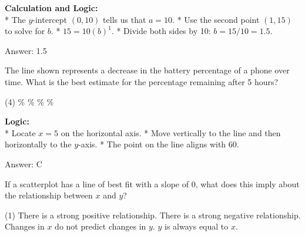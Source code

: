\documentclass[11pt,paper=a4,answers]{exam}
\begin{document}
\begin{questions}
\begin{solution}
\textbf{Calculation and Logic:} \\
* The $y$-intercept $(0, 10)$ tells us that $a = 10$.
* Use the second point $(1, 15)$ to solve for $b$.
* $15 = 10(b)^1$.
* Divide both sides by 10: $b = 15 / 10 = 1.5$.

\vspace{30pt}

Answer: \colorbox{yellow!100}{1.5}
\end{solution}

\vspace{60pt}

\question
\begin{center}
\end{center}
The line shown represents a decrease in the battery percentage of a phone over time. What is the best estimate for the percentage remaining after 5 hours?
\begin{tasks}(4)
    \%
    \%
    \%
    \%
\end{tasks}

\begin{solution}
\textbf{Logic:} \\
* Locate $x = 5$ on the horizontal axis.
* Move vertically to the line and then horizontally to the $y$-axis.
* The point on the line aligns with 60.

\vspace{30pt}

Answer: \colorbox{yellow!100}{C}
\end{solution}

\vspace{60pt}

\question
If a scatterplot has a line of best fit with a slope of 0, what does this imply about the relationship between $x$ and $y$?
\begin{tasks}(1)
    \task There is a strong positive relationship.
    \task There is a strong negative relationship.
    \task Changes in $x$ do not predict changes in $y$.
    \task $y$ is always equal to $x$.
\end{tasks}


\end{questions}
\end{document}
